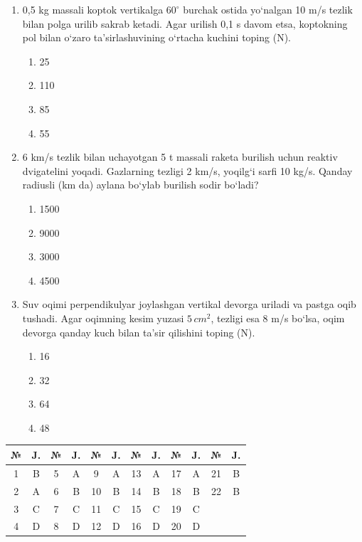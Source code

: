 \begin{enumerate}
	\item 0,5 kg massali koptok vertikalga $60^\circ$ burchak ostida yo‘nalgan 10 m/s tezlik bilan polga urilib sakrab ketadi. Agar urilish 0,1 s davom etsa, koptokning pol bilan o‘zaro ta’sirlashuvining o‘rtacha kuchini toping (N).
	\begin{enumerate}[label=\Alph*)]
		\item 25
		\item 110
		\item 85
		\item 55
	\end{enumerate}
	
	\item 6 km/s tezlik bilan uchayotgan 5 t massali raketa burilish uchun reaktiv dvigatelini yoqadi. Gazlarning tezligi 2 km/s, yoqilg‘i sarfi 10 kg/s. Qanday radiusli (km da) aylana bo‘ylab burilish sodir bo‘ladi?
	\begin{enumerate}[label=\Alph*)]
		\item 1500
		\item 9000
		\item 3000
		\item 4500
	\end{enumerate}
	
	\item Suv oqimi perpendikulyar joylashgan vertikal devorga uriladi va pastga oqib tushadi. Agar oqimning kesim yuzasi $5 \, cm^2$, tezligi esa 8 m/s bo‘lsa, oqim devorga qanday kuch bilan ta’sir qilishini toping (N).
	\begin{enumerate}[label=\Alph*)]
		\item 16
		\item 32
		\item 64
		\item 48
	\end{enumerate}
	
\end{enumerate}



\begin{table}[h!]
	\centering
	\begin{tabular}{|c|c|c|c|c|c|c|c|c|c|c|c|}
		\hline
		№ & J. & № & J. & № & J. & № & J. & № & J. & № & J. \\ \hline
		1 & B & 5 & A & 9 & A & 13 & A & 17 & A & 21 & B \\ \hline
		2 & A & 6 & B & 10 & B & 14 & B & 18 & B & 22 & B \\ \hline
		3 & C & 7 & C & 11 & C & 15 & C & 19 & C & & \\ \hline
		4 & D & 8 & D & 12 & D & 16 & D & 20 & D & & \\ \hline
	\end{tabular}
\end{table}